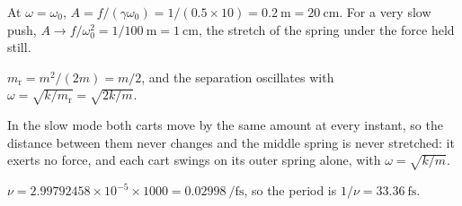 At $\omega = \omega_0$, $A = f/(\gamma\omega_0) =
1/(0.5\times10) = \SI{0.2}{\metre} = \SI{20}{\centi\metre}$. For a very slow push, $A \to
f/\omega_0^2 = 1/100\ \si{\metre} = \SI{1}{\centi\metre}$, the stretch of
the spring under the force held still.

$m_{\mathrm r} = m^2/(2m) = m/2$, and the separation
oscillates with $\omega = \sqrt{k/m_{\mathrm r}} = \sqrt{2k/m}$.

In the slow mode both carts move by the same amount
at every instant, so the distance between them never changes and the
middle spring is never stretched: it exerts no force, and each cart swings
on its outer spring alone, with $\omega = \sqrt{k/m}$.

$\nu = 2.99792458\times10^{-5}\times1000 =
\SI{0.02998}{\per\femto\second}$, so the period is $1/\nu =
\SI{33.36}{\femto\second}$.
